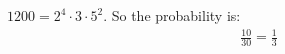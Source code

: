 $1200=2^{4} \cdot 3 \cdot 5^{2}$. So the probability is:
\begin{align*}
\frac{10}{30} = \frac{1}{3}
\end{align*}